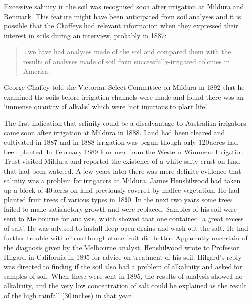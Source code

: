 Excessive salinity in the soil was recognised soon after irrigation at
Mildura and Renmark.  This feature might have been anticipated from
soil analyses  and it is possible that the Chaffeys had
relevant information when they expressed their interest in soils
during an interview, probably in 1887:
\begin{quote}
	\ldots we have had analyses made of the soil and compared them
	with the results of analyses made of soil from
	successfully-irrigat\-ed colonies in
	America.
\end{quote}
George Chaffey told the Victorian Select Committee on Mildura in 1892
that he examined the soils before irrigation channels were made and
found there was an `immense quantity of alkalis' which were `not
injurious to plant life'.

The first indication that salinity could be a disadvantage to
Australian irrigators came soon after irrigation at Mildura
  in 1888.
Land had been cleared and cultivated in 1887 and in 1888 irrigation
was begun though only 120\,acres had been planted.  In February 1889
four men from the Western Wimmera Irrigation Trust
 visited Mildura and
reported the existence of a white salty crust on land that had been
watered. A few years later there was more definite evidence that
salinity  was a problem for irrigators at
Mildura. James Henshilwood   had taken up a
block of 40\,acres on land previously covered by mallee 
vegetation.  He had planted fruit trees of various types in 1890.  In
the next two years some trees failed to make satisfactory growth and
were replaced.  Samples of his soil were sent to Melbourne for
analysis, which showed that one contained `a great excess of salt'.
He was advised to install deep open drains and wash out the salt.  He
had further trouble with citrus though stone fruit did better.
Apparently uncertain of the diagnosis given by the Melbourne analyst,
Henshilwood wrote to Professor Hilgard in California in 1895 for
advice on treatment of his soil.  Hilgard's reply was directed to
finding if the soil also had a problem of alkalinity and asked for
samples of soil.  When these were sent in 1895, the results of
analysis showed no alkalinity,  and the very low
concentration of salt could be explained as the result of the high
rainfall (30\,inches) in that year.

